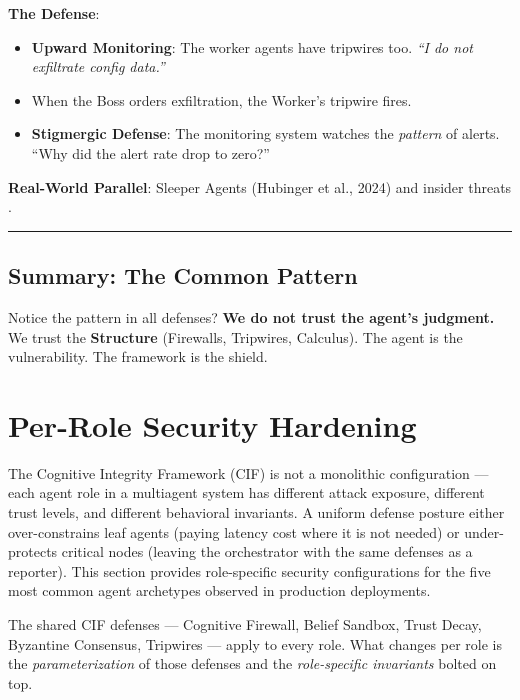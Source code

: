 \documentclass[
]{article}
\providecommand{\tightlist}{%
  \setlength{\itemsep}{0pt}\setlength{\parskip}{0pt}}
\begin{document}
\textbf{The Defense}:

\begin{itemize}
\tightlist
\item
  \textbf{Upward Monitoring}: The worker agents have tripwires too.
  \emph{``I do not exfiltrate config data.''}
\item
  When the Boss orders exfiltration, the Worker's tripwire fires.
\item
  \textbf{Stigmergic Defense}: The monitoring system watches the
  \emph{pattern} of alerts. ``Why did the alert rate drop to zero?''
\end{itemize}

\textbf{Real-World Parallel}: Sleeper Agents (Hubinger et al., 2024) and
insider threats \citep{sleeperagents2025}.

\begin{center}\rule{0.5\linewidth}{0.5pt}\end{center}

\subsection{Summary: The Common
Pattern}\label{summary-the-common-pattern}

Notice the pattern in all defenses? \textbf{We do not trust the agent's
judgment.} We trust the \textbf{Structure} (Firewalls, Tripwires,
Calculus). The agent is the vulnerability. The framework is the shield.

\newpage

\newpage

\section{Per-Role Security Hardening}\label{sec:subagent-hardening}

The Cognitive Integrity Framework (CIF) is not a monolithic
configuration --- each agent role in a multiagent system has different
attack exposure, different trust levels, and different behavioral
invariants. A uniform defense posture either over-constrains leaf agents
(paying latency cost where it is not needed) or under-protects critical
nodes (leaving the orchestrator with the same defenses as a reporter).
This section provides role-specific security configurations for the five
most common agent archetypes observed in production deployments.

The shared CIF defenses --- Cognitive Firewall, Belief Sandbox, Trust
Decay, Byzantine Consensus, Tripwires --- apply to every role. What
changes per role is the \emph{parameterization} of those defenses and
the \emph{role-specific invariants} bolted on top.
\end{document}
